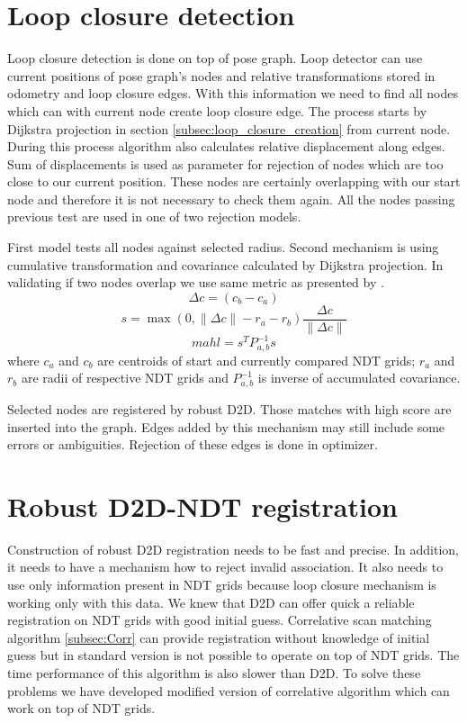 \section{Loop closure detection}
\label{sec:LoopClosureMetric}
Loop closure detection is done on top of pose graph. Loop detector can use current positions of pose graph's nodes and relative transformations stored in odometry and loop closure edges. With this information we need to find all nodes which can with current node create loop closure edge. The process starts by Dijkstra projection in section \ref{subsec:loop_closure_creation} from current node. During this process algorithm also  calculates relative displacement along edges. Sum of displacements is used as parameter for rejection of nodes which are too close to our current position. These nodes are certainly overlapping with our start node and therefore it is not necessary to check them again. All the nodes passing previous test are used in one of two rejection models. 

First model tests all nodes against selected radius. Second mechanism is using cumulative transformation and covariance calculated by Dijkstra projection. In validating if two nodes overlap we use same metric as presented by \cite{Olson2009Loop}.
\begin{equation}
\varDelta c = (c_{b} - c_{a})
\end{equation}
\begin{equation}
s  = \max(0,\lVert \varDelta c\rVert - r_{a} - r_{b})\frac{\varDelta c}{\lVert \varDelta c\rVert}
\end{equation}
\begin{equation}
mahl = s^{T}P_{a,b}^{-1}s
\end{equation}
where $c_{a}$ and $c_{b}$ are centroids of start and currently compared \gls{NDT} grids; $r_{a}$ and $r_{b}$ are radii of respective \gls{NDT} grids and $P_{a,b}^{-1}$ is inverse of accumulated covariance.
 
Selected nodes are registered by robust \gls{D2D}. Those matches with high score are inserted into the graph. Edges added by this mechanism may still include some errors or ambiguities. Rejection of these edges is done in optimizer.


\section{Robust D2D-NDT registration}
\label{sec:Robust D2D-NDT}
Construction of robust \gls{D2D} registration needs to be fast and precise. In addition, it needs to have a mechanism how to reject invalid association. It also needs to use only information present in \gls{NDT} grids because loop closure mechanism is working only with this data. We knew that \gls{D2D} can offer quick a reliable registration on \gls{NDT} grids with good initial guess. Correlative scan matching algorithm  \ref{subsec:Corr} can provide registration without knowledge of initial guess but in standard version is not possible to operate on top of \gls{NDT} grids. The time performance of this algorithm is also slower than \gls{D2D}. To solve these problems we have developed modified version of correlative algorithm which can work on top of \gls{NDT} grids.

